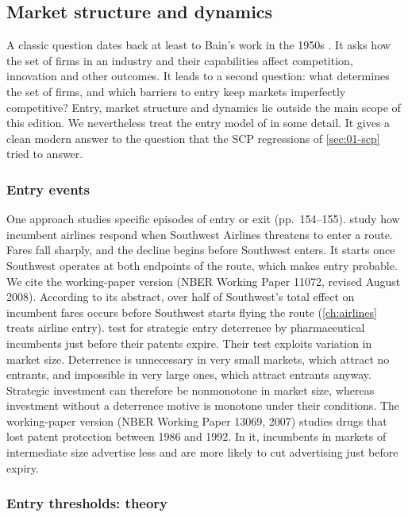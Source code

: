 \subsection{Market structure and dynamics}\label{sec:01-today-structure}

A classic question dates back at least to Bain's work in the 1950s \citep[p.~154]{EinavLevin2010}. It asks how
the set of firms in an industry and their capabilities affect competition, innovation and other outcomes. It
leads to a second question: what determines the set of firms, and which barriers to entry keep markets
imperfectly competitive? Entry, market structure and dynamics lie outside the main scope of this edition.
We nevertheless treat the entry model of \citet{BresnahanReiss1991} in some detail. It gives a clean modern
answer to the question that the SCP regressions of \cref{sec:01-scp} tried to answer.

\subsubsection{Entry events}

One approach studies specific episodes of entry or exit (pp.~154--155). \citet{GoolsbeeSyverson2008} study how
incumbent airlines respond when Southwest Airlines threatens to enter a route. Fares fall sharply, and the
decline begins before Southwest enters. It starts once Southwest operates at both endpoints of the route, which
makes entry probable. We cite the working-paper version (NBER Working Paper 11072, revised August 2008).
According to its abstract, over half of Southwest's total effect on incumbent fares occurs before Southwest
starts flying the route (\cref{ch:airlines} treats airline entry).
\citet{EllisonEllison2011} test for strategic entry deterrence by pharmaceutical incumbents just before their
patents expire. Their test exploits variation in market size. Deterrence is unnecessary in very small markets,
which attract no entrants, and impossible in very large ones, which attract entrants anyway. Strategic
investment can therefore be nonmonotone in market size, whereas investment without a deterrence motive is
monotone under their conditions. The working-paper version (NBER Working Paper 13069, 2007) studies drugs
that lost patent protection between 1986 and 1992. In it, incumbents in markets of intermediate size advertise
less and are more likely to cut advertising just before expiry.

\subsubsection{Entry thresholds: theory}

